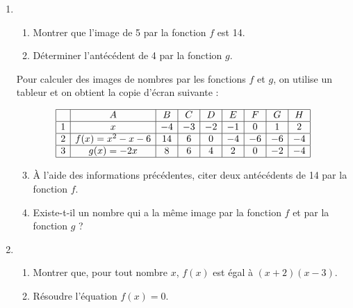 \documentclass{article}
\begin{document}
\begin{enumerate}
    \item 
    \begin{enumerate}
        \item Montrer que l’image de 5 par la fonction \( f \) est 14.
        \item Déterminer l’antécédent de 4 par la fonction \( g \).
    \end{enumerate}
    
    Pour calculer des images de nombres par les fonctions \( f \) et \( g \), on utilise un tableur et on obtient la copie d’écran suivante :

    \[
    \begin{array}{|c|c|c|c|c|c|c|c|c|}
    \hline
     & A & B & C & D & E & F & G & H \\
    \hline
    1 & x & -4 & -3 & -2 & -1 & 0 & 1 & 2 \\
    \hline
    2 & f(x) = x^2 - x - 6 & 14 & 6 & 0 & -4 & -6 & -6 & -4 \\
    \hline
    3 & g(x) = -2x & 8 & 6 & 4 & 2 & 0 & -2 & -4 \\
    \hline
    \end{array}
    \]

    \begin{enumerate}
        \setcounter{enumii}{2}
        \item À l’aide des informations précédentes, citer deux antécédents de 14 par la fonction \( f \).
        \item Existe-t-il un nombre qui a la même image par la fonction \( f \) et par la fonction \( g \) ?
    \end{enumerate}
\end{enumerate}
\begin{enumerate}
    \setcounter{enumi}{1}
    \item 
    \begin{enumerate}
        \item Montrer que, pour tout nombre \( x \), \( f(x) \) est égal à \( (x+2)(x-3) \).
        \item Résoudre l’équation \( f(x) = 0 \).
    \end{enumerate}
\end{enumerate}
\end{document}

